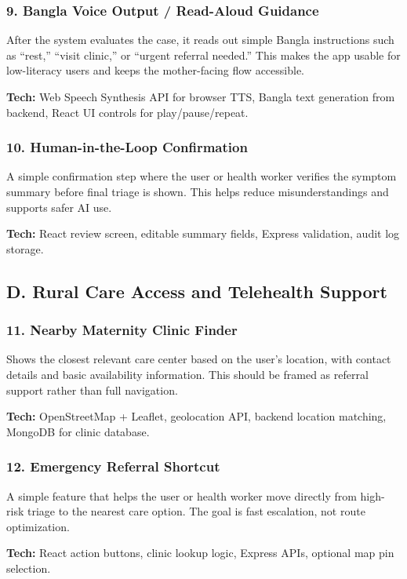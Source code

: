\documentclass[11pt]{article}
\begin{document}
\subsubsection{9. Bangla Voice Output / Read-Aloud Guidance}
After the system evaluates the case, it reads out simple Bangla instructions such as ``rest,'' ``visit clinic,'' or ``urgent referral needed.'' This makes the app usable for low-literacy users and keeps the mother-facing flow accessible.

\textbf{Tech:} Web Speech Synthesis API for browser TTS, Bangla text generation from backend, React UI controls for play/pause/repeat.

\subsubsection{10. Human-in-the-Loop Confirmation}
A simple confirmation step where the user or health worker verifies the symptom summary before final triage is shown. This helps reduce misunderstandings and supports safer AI use.

\textbf{Tech:} React review screen, editable summary fields, Express validation, audit log storage.

\subsection{D. Rural Care Access and Telehealth Support}

\subsubsection{11. Nearby Maternity Clinic Finder}
Shows the closest relevant care center based on the user’s location, with contact details and basic availability information. This should be framed as referral support rather than full navigation.

\textbf{Tech:} OpenStreetMap + Leaflet, geolocation API, backend location matching, MongoDB for clinic database.

\subsubsection{12. Emergency Referral Shortcut}
A simple feature that helps the user or health worker move directly from high-risk triage to the nearest care option. The goal is fast escalation, not route optimization.

\textbf{Tech:} React action buttons, clinic lookup logic, Express APIs, optional map pin selection.
\end{document}
